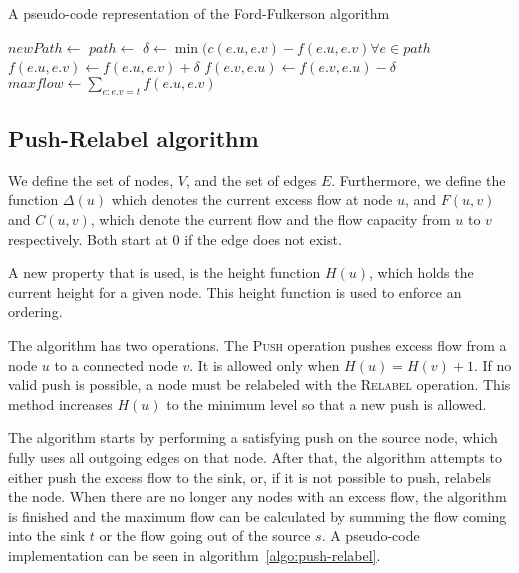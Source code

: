 \begin{algorithm}
\caption{A pseudo-code representation of the Ford-Fulkerson algorithm}
\label{algo:ford-fulkerson}
\begin{algorithmic}

		\State {}
	\Else
			\State $newPath \gets$ 
				\State {}
			\EndIf
		\EndFor
		\State \Return{$\emptyset$}
	\EndIf
\EndFunction
\State
{}
	\State $path \gets$ 
	\State $\delta \gets \min(c(e.u, e.v) - f(e.u, e.v) \forall e \in path$
		\State $f(e.u, e.v) \gets f(e.u, e.v) + \delta$
		\State $f(e.v, e.u) \gets f(e.v, e.u) - \delta$
	\EndFor
\EndWhile
\State $maxflow \gets \sum\limits_{e : e.v = t} f(e.u, e.v)$

\end{algorithmic}
\end{algorithm}

\subsection{Push-Relabel algorithm}
\label{subsect:pushrelabel}

We define the set of nodes, $V$, and the set of edges $E$. Furthermore, we define the function $\Delta(u)$ which denotes the current excess flow at node $u$, and $F(u, v)$ and $C(u, v)$, which denote the current flow and the flow capacity from $u$ to $v$ respectively. Both start at $0$ if the edge does not exist.

A new property that is used, is the height function $H(u)$, which holds the current height for a given node. This height function is used to enforce an ordering.

The algorithm has two operations. The \textsc{Push} operation pushes excess flow from a node $u$ to a connected node $v$. It is allowed only when $H(u) = H(v) + 1$. If no valid push is possible, a node must be relabeled with the \textsc{Relabel} operation. This method increases $H(u)$ to the minimum level so that a new push is allowed.

The algorithm starts by performing a satisfying push on the source node, which fully uses all outgoing edges on that node. After that, the algorithm attempts to either push the excess flow to the sink, or, if it is not possible to push, relabels the node. When there are no longer any nodes with an excess flow, the algorithm is finished and the maximum flow can be calculated by summing the flow coming into the sink $t$ or the flow going out of the source $s$. A pseudo-code implementation can be seen in algorithm~\autoref{algo:push-relabel}.

